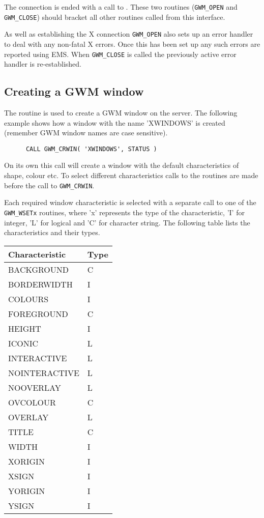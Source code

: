 The connection is ended with a call to .
These two routines
({\tt GWM\_OPEN} and {\tt GWM\_CLOSE}) should bracket all other routines
called from this interface.

As well as establishing the X connection {\tt GWM\_OPEN} also sets up
an error handler to deal with any non-fatal X errors. Once this has been
set up any such errors are reported using EMS. When {\tt GWM\_CLOSE} is
called the previously active error handler is re-established.

\subsection{Creating a GWM window}
The routine 
is used to create a GWM window on the
server. The following example shows how a window with the name 'XWINDOWS'
is created (remember GWM window names are case sensitive).
\begin{verbatim}
      CALL GWM_CRWIN( 'XWINDOWS', STATUS )
\end{verbatim}
On its own this call will create a window with the default characteristics
of shape, colour etc. To select different characteristics calls to the
routines  are made before 
the call to {\tt GWM\_CRWIN}.

Each required window characteristic is selected with a separate call to
one of the {\tt GWM\_WSETx} routines, where 'x' represents the type of
the characteristic, 'I' for integer, 'L' for logical and 'C' for character
string. The following table lists the characteristics and their types.

\begin{center}
\begin{tabular}{|l|l|}   \hline
Characteristic & Type \\ \hline
BACKGROUND     & C    \\
BORDERWIDTH    & I    \\
COLOURS        & I    \\
FOREGROUND     & C    \\
HEIGHT         & I    \\
ICONIC         & L    \\
INTERACTIVE    & L    \\
NOINTERACTIVE  & L    \\
NOOVERLAY      & L    \\
OVCOLOUR       & C    \\
OVERLAY        & L    \\
TITLE          & C    \\ 
WIDTH          & I    \\
XORIGIN        & I    \\
XSIGN          & I    \\
YORIGIN        & I    \\
YSIGN          & I    \\ \hline
\end{tabular}
\end{center}


